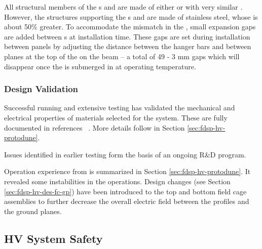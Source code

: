 All structural members of the s and  are made of either \frfour or  with very similar . However, the structures supporting the s and  are made of stainless steel, whose  is about 50\% greater.  To accommodate the mismatch in the , small expansion gaps are added between s at installation time. These gaps are set during installation between  panels by adjusting the distance between the  hanger bars and between  planes at the top of the  on the  beam -- a total of 49 - 3 mm gaps which will disappear once the  is submerged in \lar at operating temperature.
 
\subsubsection{Design Validation}

Successful  running and extensive testing has %
validated the mechanical and electrical properties of materials selected for the  system.  These are fully documented in references ~\cite{bib:docdb2338, bib:docdb1504, bib:docdb1601}. More details follow in Section \ref{sec:fdsp-hv-protodune}.

Issues identified in earlier testing form the basis of an ongoing R\&D program. 


Operation experience from  is summarized in Section \ref{sec:fdsp-hv-protodune}. It revealed some instabilities in the  operations.  Design changes (see Section \ref{sec:fdsp-hv-des-fc-gp}) have been introduced to the top and bottom field cage assemblies to further decrease the overall electric field between the profiles and the ground planes.


\subsection{HV System Safety}
\label{fdsp-hv-design-safety}


